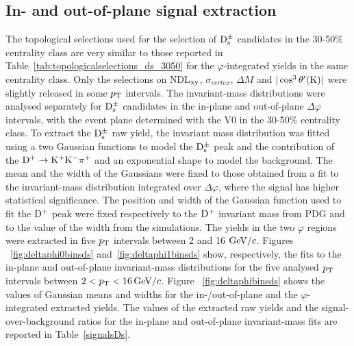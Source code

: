  \subsection{In- and out-of-plane signal extraction}
 \label{sec:SigExtracV2}
 The topological selections used for the selection of ${\rm D_s^{\pm}}$ candidates in the 30-50\% centrality class
 are very similar to those reported in Table~\ref{tab:topologicalselections_ds_3050} for the
 $\varphi$-integrated yields in the same centrality class.
 Only the selections on NDL$_{\rm xy}$, $\sigma_{vertex}$, $\Delta M$ 
 and $|\cos^3 \theta^\prime({\rm K})|$ were slightly released in some $p_{\rm T}$
 intervals. The invariant-mass distributions were analysed separately for ${\rm D_s^{\pm}}$ candidates
 in the in-plane and out-of-plane $\Delta \varphi$ intervals, 
with the event plane determined with the V0 
in the 30-50\% centrality class. To extract the ${\rm D_s^{\pm}}$ raw yield, the invariant mass distribution was fitted using a two Gaussian
functions to model the ${\rm D_s^{\pm}}$ peak and the contribution of the ${\rm D^{+}\to K^+ K^-\pi^+}$ and 
an exponential shape to model the background.
The mean and the width of the Gaussians were fixed to those obtained from a fit to
the invariant-mass distribution integrated over $\Delta \varphi$, 
where the signal has higher statistical significance. 
The position and width of the Gaussian function used to fit the ${\rm D^+}$ peak 
were fixed respectively to the ${\rm D^+}$ invariant mass from PDG and to the value of the width from the simulations.
The yields in the two $\varphi$ regions were extracted in five $p_{\rm T}$ 
intervals between 2 and 16 $\mathrm{GeV}/c$.
Figures ~\ref{fig:deltaphi0binsds} and~\ref{fig:deltaphi1binsds} show, respectively, the fits to the in-plane and out-of-plane
invariant-mass distributions for the five analysed $p_{\rm T}$ intervals between $2 < p_{\rm T} <16 \, \mathrm{GeV}/c$.
Figure ~\ref{fig:deltaphibinsds} shows the values of Gaussian means and 
widths for the in-/out-of-plane and the $\varphi$-integrated extracted yields.
The values of the extracted raw yields and the signal-over-background 
ratios for the in-plane and out-of-plane invariant-mass fits 
are reported in Table~\ref{signalsDs}.

